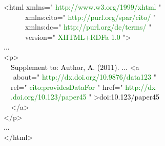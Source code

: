 \raggedright\small\bgroup\ttfamily\frenchspacing
<html \textcolor{dccblue}{xmlns="}%
\textcolor{Green}{http://www.w3.org/1999/xhtml}%
\textcolor{dccblue}{"\\~~~~~~xmlns:cito="}%
\textcolor{Green}{http://purl.org/spar/cito/}%
\textcolor{dccblue}{"\\~~~~~~xmlns:dc="}%
\textcolor{Green}{http://purl.org/dc/terms/}%
\textcolor{dccblue}{"\\~~~~~~version="}%
\textcolor{Green}{XHTML+RDFa 1.0}%
\textcolor{dccblue}{"}>\\
\textcolor{black}{...}\\
<p>\\~~\textcolor{black}{Supplement to: Author, A. (2011). ... }<a\\~~%
\textcolor{dccblue}{about="}%
\textcolor{Green}{http://dx.doi.org/10.9876/data123}%
\textcolor{dccblue}{"\\~~rel="}%
\textcolor{Green}{cito:providesDataFor}%
\textcolor{dccblue}{" href="}%
\textcolor{Green}{http://dx\\~~.doi.org/10.123/paper45}%
\textcolor{dccblue}{"}%
>\textcolor{black}{doi:10.123/paper45}\\~~</a>\\</p>\\
\textcolor{black}{...}\\
</html>\egroup
